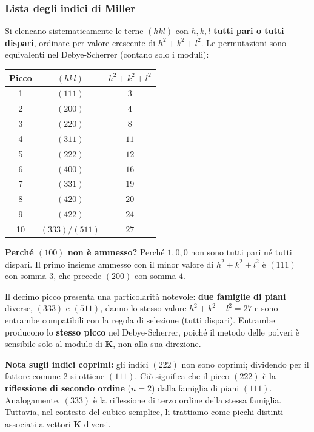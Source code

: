 \subsubsection{Lista degli indici di Miller}

Si elencano sistematicamente le terne $(hkl)$ con $h, k, l$ \textbf{tutti pari o tutti dispari}, ordinate per valore crescente di $h^2 + k^2 + l^2$. Le permutazioni sono equivalenti nel Debye-Scherrer (contano solo i moduli):

\begin{table}[h!]
\centering
\begin{tabular}{|c|c|c|}
\hline
Picco & $(hkl)$ & $h^2 + k^2 + l^2$ \\ \hline
1 & $(111)$ & $3$ \\
2 & $(200)$ & $4$ \\
3 & $(220)$ & $8$ \\
4 & $(311)$ & $11$ \\
5 & $(222)$ & $12$ \\
6 & $(400)$ & $16$ \\
7 & $(331)$ & $19$ \\
8 & $(420)$ & $20$ \\
9 & $(422)$ & $24$ \\
10 & $(333)/(511)$ & $27$ \\ \hline
\end{tabular}
\end{table}

\begin{nota}
\textbf{Perché $(100)$ non è ammesso?} Perché $1, 0, 0$ non sono tutti pari né tutti dispari. Il primo insieme ammesso con il minor valore di $h^2 + k^2 + l^2$ è $(111)$ con somma $3$, che precede $(200)$ con somma $4$.
\end{nota}



Il decimo picco presenta una particolarità notevole: \textbf{due famiglie di piani} diverse, $(333)$ e $(511)$, danno lo stesso valore $h^2 + k^2 + l^2 = 27$ e sono entrambe compatibili con la regola di selezione (tutti dispari). Entrambe producono lo \textbf{stesso picco} nel Debye-Scherrer, poiché il metodo delle polveri è sensibile solo al modulo di $\mathbf{K}$, non alla sua direzione.

\begin{nota}
\textbf{Nota sugli indici coprimi:} gli indici $(222)$ non sono coprimi; dividendo per il fattore comune $2$ si ottiene $(111)$. Ciò significa che il picco $(222)$ è la \textbf{riflessione di secondo ordine} ($n = 2$) dalla famiglia di piani $(111)$. Analogamente, $(333)$ è la riflessione di terzo ordine della stessa famiglia. Tuttavia, nel contesto del cubico semplice, li trattiamo come picchi distinti associati a vettori $\mathbf{K}$ diversi.
\end{nota}


